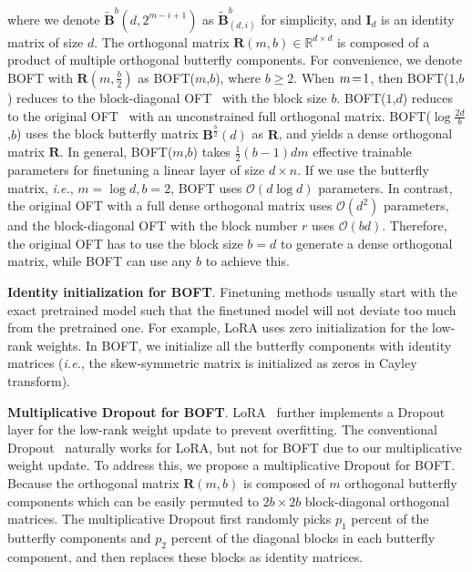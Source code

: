 \documentclass{article} %
\newcommand{\ie}{\emph{i.e.}}
\begin{document}
where we denote $\tilde{\bm{B}}^b(d,2^{m - i+1})$ as $\tilde{\bm{B}}^b_{(d,i)}$ for simplicity, and $\bm{I}_d$ is an identity matrix of size $d$. The orthogonal matrix $\bm{R}(m,b)\in\mathbb{R}^{d\times d}$ is composed of a product of multiple orthogonal butterfly components. For convenience, we denote BOFT with $\bm{R}(m,\frac{b}{2})$ as BOFT($m$,$b$), where $b\geq 2$. When $\thickmuskip=2mu \medmuskip=2mu m=1$, then BOFT($1$,$b$) reduces to the block-diagonal OFT~\cite{qiu2023controlling} with the block size $b$. BOFT($1$,$d$) reduces to the original OFT~\cite{qiu2023controlling} with an unconstrained full orthogonal matrix. BOFT($\log \frac{2d}{b}$,$b$) uses the block butterfly matrix $\bm{B}^{\frac{b}{2}}(d)$ as $\bm{R}$, and yields a dense orthogonal matrix $\bm{R}$. In general, BOFT($m$,$b$) takes $\frac{1}{2}(b-1)dm$ effective trainable parameters for finetuning a linear layer of size $d\times n$. If we use the butterfly matrix, \ie, $m=\log d,b=2$, BOFT uses $\mathcal{O}(d\log d)$ parameters. In contrast, the original OFT with a full dense orthogonal matrix uses $\mathcal{O}(d^2)$ parameters, and the block-diagonal OFT with the block number $r$ uses $\mathcal{O}(bd)$. Therefore, the original OFT has to use the block size $b=d$ to generate a dense orthogonal matrix, while BOFT can use any $b$ to achieve this.

\newpage


\textbf{Identity initialization for BOFT}. Finetuning methods usually start with the exact pretrained model such that the finetuned model will not deviate too much from the pretrained one. 
For example, LoRA uses zero initialization for the low-rank weights. 
In BOFT, we initialize all the butterfly components with identity matrices (\ie, the skew-symmetric matrix is initialized as zeros in Cayley transform).

\textbf{Multiplicative Dropout for BOFT}. LoRA~\cite{hulora2022} further implements a Dropout layer for the low-rank weight update to prevent overfitting. The conventional Dropout~\cite{srivastava2014dropout} naturally works for LoRA, but not for BOFT due to our multiplicative weight update. To address this, we propose a multiplicative Dropout for BOFT. Because the orthogonal matrix $\bm{R}(m,b)$ is composed of $m$ orthogonal butterfly components which can be easily permuted to $2b\times 2b$ block-diagonal orthogonal matrices. The multiplicative Dropout first randomly picks $p_1$ percent of the butterfly components and $p_2$ percent of the diagonal blocks in each butterfly component, and then replaces these blocks as identity matrices.
\end{document}
